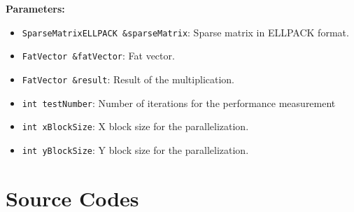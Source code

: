 \documentclass[12pt,oneside]{book} %
\begin{document}
\begin{subappendices}
    \textbf{Parameters:}
    \begin{itemize}
        \item \texttt{SparseMatrixELLPACK \&sparseMatrix}: Sparse matrix in ELLPACK format.
        \item \texttt{FatVector \&fatVector}: Fat vector.
        \item \texttt{FatVector \&result}: Result of the multiplication.
        \item \texttt{int testNumber}: Number of iterations for the performance measurement
        \item \texttt{int xBlockSize}: X block size for the parallelization.
        \item \texttt{int yBlockSize}: Y block size for the parallelization.
    \end{itemize}

\end{subappendices}

\chapter{Source Codes}

\end{document}
